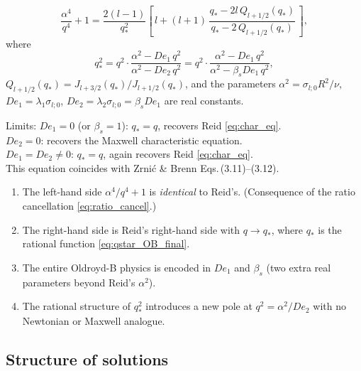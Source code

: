 \begin{keybox}
\begin{equation}
  \frac{\alpha^4}{q^4} + 1
  = \frac{2(l-1)}{q_*^2}
    \left[\,l + (l+1)\,\frac{q_* - 2l\,Q_{l+1/2}(q_*)}{q_* - 2\,Q_{l+1/2}(q_*)}\,\right],
  \label{eq:char_OB}
\end{equation}
where
\begin{equation}
  q_*^2 = q^2\cdot\frac{\alpha^2-De_1\,q^2}{\alpha^2-De_2\,q^2}
  = q^2\cdot\frac{\alpha^2-De_1\,q^2}{\alpha^2-\beta_s De_1\,q^2},
  \label{eq:qstar_OB_final}
\end{equation}
$Q_{l+1/2}(q_*) = J_{l+3/2}(q_*)/J_{l+1/2}(q_*)$, and the parameters
$\alpha^2 = \sigma_{l;0}R^2/\nu$, $De_1 = \lambda_1\sigma_{l;0}$,
$De_2 = \lambda_2\sigma_{l;0} = \beta_s De_1$ are real constants.

\smallskip\noindent Limits:
$De_1 = 0$ (or $\beta_s = 1$): $q_* = q$, recovers Reid \eqref{eq:char_eq}.\\
$De_2 = 0$: recovers the Maxwell characteristic equation.\\
$De_1 = De_2 \neq 0$: $q_* = q$, again recovers Reid \eqref{eq:char_eq}.\\[2pt]
This equation coincides with Zrni\'{c} \& Brenn \cite{zirnic2024} Eqs.\,(3.11)--(3.12).
\end{keybox}

\begin{notebox}
\begin{enumerate}
  \item The left-hand side $\alpha^4/q^4 + 1$ is \emph{identical} to Reid's.
        (Consequence of the ratio cancellation \eqref{eq:ratio_cancel}.)
  \item The right-hand side is Reid's right-hand side with $q \to q_*$,
        where $q_*$ is the rational function \eqref{eq:qstar_OB_final}.
  \item The entire Oldroyd-B physics is encoded in $De_1$ and $\beta_s$
        (two extra real parameters beyond Reid's $\alpha^2$).
  \item The rational structure of $q_*^2$ introduces a new pole
        at $q^2 = \alpha^2/De_2$ with no Newtonian or Maxwell analogue.
\end{enumerate}
\end{notebox}

\subsection{Structure of solutions}
\label{sec:OB_roots}


